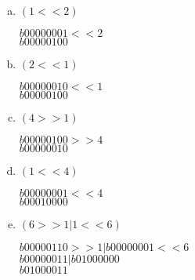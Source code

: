 \documentclass[12pt,letterpaper]{article}
\begin{document}
\begin{enumerate}
            \begin{enumerate}[a.]

                \item $(1<<2)$
                
                    $b00000001<<2$\\
                    $b00000100$

                \item $(2<<1)$
                
                    $b00000010<<1$\\
                    $b00000100$

                \item $(4>>1)$
                    
                    $b00000100>>4$\\
                    $b00000010$

                \item $(1<<4)$
                
                    $b00000001<<4$\\
                    $b00010000$

                \item $(6>>1|1<<6)$
                
                    $b00000110>>1|b00000001<<6$\\
                    $b00000011|b01000000$\\
                    $b01000011$

            \end{enumerate}

\end{enumerate}
\end{document}
